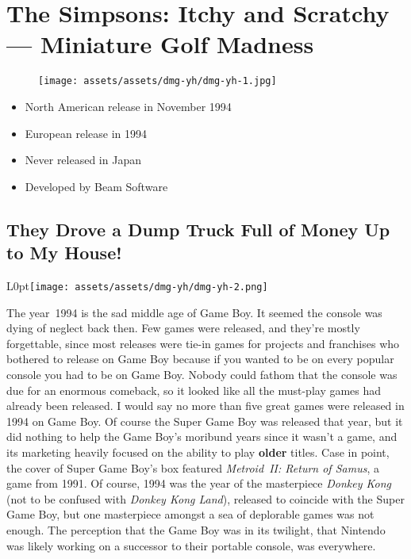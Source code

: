 \documentclass{book}
\begin{document}
\chapter*{The Simpsons: Itchy and Scratchy — Miniature Golf Madness}
\vspace{\baselineskip}\begin{figure}[H]{\texttt{[image: assets/assets/dmg-yh/dmg-yh-1.jpg]}}\end{figure}\vspace{\baselineskip}
\begin{itemize}[left=0pt, nosep]
\item North American release in November 1994
\item European release in 1994
\item Never released in Japan
\item Developed by Beam Software

\end{itemize}
\newpage\FloatBarrier\section*{They Drove a Dump Truck Full of Money Up to My House!}
\begin{wrapfigure}{L}{0pt}{\texttt{[image: assets/assets/dmg-yh/dmg-yh-2.png]}}\end{wrapfigure}\noindent
The year~1994 is the sad middle age of Game Boy. It seemed the console was dying of neglect back then. Few games were released, and they’re mostly forgettable, since most releases were tie-in games for projects and franchises who bothered to release on Game Boy because if you wanted to be on every popular console you had to be on Game Boy. Nobody could fathom that the console was due for an enormous comeback, so it looked like all the must-play games had already been released. I would say no more than five great games were released in 1994 on Game Boy. Of course the Super Game Boy was released that year, but it did nothing to help the Game Boy’s moribund years since it wasn’t a game, and its marketing heavily focused on the ability to play \textbf{older} titles. Case in point, the cover of Super Game Boy’s box featured \emph{Metroid~II: Return of Samus}, a game from 1991. Of course, 1994 was the year of the masterpiece \emph{Donkey Kong} (not to be confused with \emph{Donkey Kong Land}), released to coincide with the Super Game Boy, but one masterpiece amongst a sea of deplorable games was not enough. The perception that the Game Boy was in its twilight, that Nintendo was likely working on a successor to their portable console, was everywhere.\par
\end{document}
